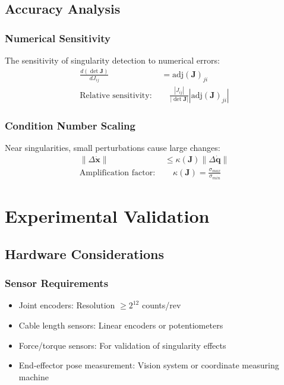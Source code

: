 \documentclass[11pt,a4paper]{article}
\begin{document}
\subsection{Accuracy Analysis}

\subsubsection{Numerical Sensitivity}
The sensitivity of singularity detection to numerical errors:
\begin{align}
\frac{d(\det \bm{J})}{d J_{ij}} &= \text{adj}(\bm{J})_{ji} \\
\text{Relative sensitivity: } &\quad \frac{|J_{ij}|}{|\det \bm{J}|} |\text{adj}(\bm{J})_{ji}|
\end{align}

\subsubsection{Condition Number Scaling}
Near singularities, small perturbations cause large changes:
\begin{align}
\|\Delta \dot{\bm{x}}\| &\leq \kappa(\bm{J}) \|\Delta \dot{\bm{q}}\| \\
\text{Amplification factor: } &\quad \kappa(\bm{J}) = \frac{\sigma_{max}}{\sigma_{min}}
\end{align}

\section{Experimental Validation}

\subsection{Hardware Considerations}

\subsubsection{Sensor Requirements}
\begin{itemize}
    \item Joint encoders: Resolution $\geq 2^{12}$ counts/rev
    \item Cable length sensors: Linear encoders or potentiometers
    \item Force/torque sensors: For validation of singularity effects
    \item End-effector pose measurement: Vision system or coordinate measuring machine
\end{itemize}
\end{document}
